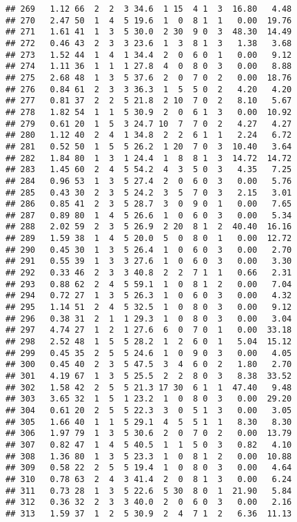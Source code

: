 \documentclass[
]{article}
\begin{document}
\begin{verbatim}
## 269   1.12 66  2  2  3 34.6  1 15  4 1  3  16.80   4.48
## 270   2.47 50  1  4  5 19.6  1  0  8 1  1   0.00  19.76
## 271   1.61 41  1  3  5 30.0  2 30  9 0  3  48.30  14.49
## 272   0.46 43  2  3  3 23.6  1  3  8 1  3   1.38   3.68
## 273   1.52 44  1  4  1 34.4  2  0  6 0  1   0.00   9.12
## 274   1.11 36  1  1  1 27.8  4  0  8 0  3   0.00   8.88
## 275   2.68 48  1  3  5 37.6  2  0  7 0  2   0.00  18.76
## 276   0.84 61  2  3  3 36.3  1  5  5 0  2   4.20   4.20
## 277   0.81 37  2  2  5 21.8  2 10  7 0  2   8.10   5.67
## 278   1.82 54  1  1  5 30.9  2  0  6 1  3   0.00  10.92
## 279   0.61 20  1  5  3 24.7 10  7  7 0  2   4.27   4.27
## 280   1.12 40  2  4  1 34.8  2  2  6 1  1   2.24   6.72
## 281   0.52 50  1  5  5 26.2  1 20  7 0  3  10.40   3.64
## 282   1.84 80  1  3  1 24.4  1  8  8 1  3  14.72  14.72
## 283   1.45 60  2  4  5 54.2  4  3  5 0  3   4.35   7.25
## 284   0.96 53  1  3  5 27.4  2  0  6 0  3   0.00   5.76
## 285   0.43 30  2  3  5 24.2  3  5  7 0  3   2.15   3.01
## 286   0.85 41  2  3  5 28.7  3  0  9 0  1   0.00   7.65
## 287   0.89 80  1  4  5 26.6  1  0  6 0  3   0.00   5.34
## 288   2.02 59  2  3  5 26.9  2 20  8 1  2  40.40  16.16
## 289   1.59 38  1  4  5 20.0  5  0  8 0  1   0.00  12.72
## 290   0.45 30  1  3  5 26.4  1  0  6 0  3   0.00   2.70
## 291   0.55 39  1  3  3 27.6  1  0  6 0  3   0.00   3.30
## 292   0.33 46  2  3  3 40.8  2  2  7 1  1   0.66   2.31
## 293   0.88 62  2  4  5 59.1  1  0  8 1  2   0.00   7.04
## 294   0.72 27  1  3  5 26.3  1  0  6 0  3   0.00   4.32
## 295   1.14 51  2  4  5 32.5  1  0  8 0  3   0.00   9.12
## 296   0.38 31  2  1  1 29.3  1  0  8 0  3   0.00   3.04
## 297   4.74 27  1  2  1 27.6  6  0  7 0  1   0.00  33.18
## 298   2.52 48  1  5  5 28.2  1  2  6 0  1   5.04  15.12
## 299   0.45 35  2  5  5 24.6  1  0  9 0  3   0.00   4.05
## 300   0.45 40  2  3  5 47.5  3  4  6 0  2   1.80   2.70
## 301   4.19 67  1  3  5 25.5  2  2  8 0  3   8.38  33.52
## 302   1.58 42  2  5  5 21.3 17 30  6 1  1  47.40   9.48
## 303   3.65 32  1  5  1 23.2  1  0  8 0  3   0.00  29.20
## 304   0.61 20  2  5  5 22.3  3  0  5 1  3   0.00   3.05
## 305   1.66 40  1  1  5 29.1  4  5  5 1  1   8.30   8.30
## 306   1.97 79  1  3  5 30.6  2  0  7 0  2   0.00  13.79
## 307   0.82 47  1  4  5 40.5  1  1  5 0  3   0.82   4.10
## 308   1.36 80  1  3  5 23.3  1  0  8 1  2   0.00  10.88
## 309   0.58 22  2  5  5 19.4  1  0  8 0  3   0.00   4.64
## 310   0.78 63  2  4  3 41.4  2  0  8 1  3   0.00   6.24
## 311   0.73 28  1  3  5 22.6  5 30  8 0  1  21.90   5.84
## 312   0.36 32  2  3  3 40.0  2  0  6 0  3   0.00   2.16
## 313   1.59 37  1  2  5 30.9  2  4  7 1  2   6.36  11.13

\end{verbatim}
\end{document}

